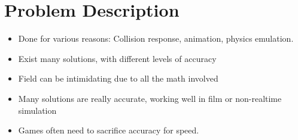 \chapter{Problem Description}


\think
{
    \begin{itemize}
        \item Done for various reasons: Collision response, animation, physics emulation.
        \item Exist many solutions, with different levels of accuracy
        \item Field can be intimidating due to all the math involved
        \item Many solutions are really accurate, working well in film or non-realtime simulation
        \item Games often need to sacrifice accuracy for speed.
    \end{itemize}
}
